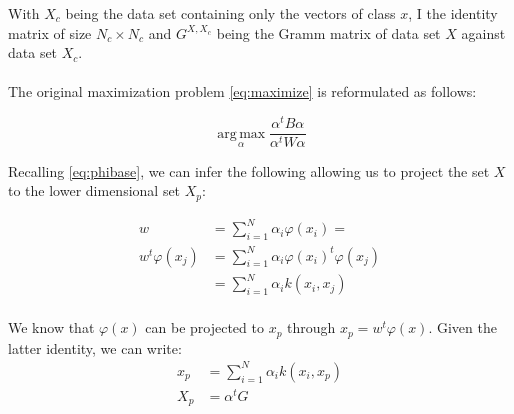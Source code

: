 With $X_c$ being the data set containing only the vectors of class $x$, $\textrm{I}$ the identity matrix of
size $N_c \times N_c$ and
$G^{X, X_c}$ being the Gramm matrix of data set $X$ against data set $X_c$.

\paragraph{}
The original maximization problem \ref{eq:maximize} is reformulated as follows:

\begin{equation*}
\label{eq:maximize2}
\boxed{\operatorname*{arg\,max}_\alpha \frac{\alpha^t B \alpha}{\alpha^t W \alpha}}
\end{equation*}

Recalling \ref{eq:phibase}, we can infer the following allowing us to project the set $X$ to the
lower dimensional set $X_p$:

\begin{align*}
  w &= \sum_{i=1}^N \alpha_i \varphi(x_i) = \\
  w^t \varphi(x_j) &= \sum_{i = 1}^N \alpha_i \varphi(x_i)^t \varphi(x_j)\\
                   &= \sum_{i = 1}^N \alpha_i k(x_i, x_j) \\
\end{align*}

We know that $\varphi(x)$ can be projected to $x_p$ through $x_p = w^t \varphi(x)$. Given the
latter identity, we can write:
\begin{align*}
x_p &= \sum_{i = 1}^N \alpha_i k(x_i, x_p) \\
X_p &= \alpha^t G \\
\end{align*}

